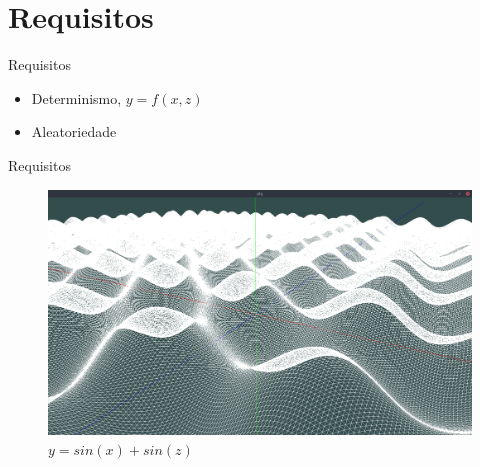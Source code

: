 \section{Requisitos}

\begin{frame}{Requisitos}
    \begin{itemize}
        \item Determinismo, $ y = f(x, z) $
        \item \alert{Aleatoriedade}
    \end{itemize}
\end{frame}

\begin{frame}{Requisitos}
    \begin{figure}
		\centering
        \includegraphics[width=.8\textwidth]{img/intro/sssins.png}
        \caption{$ y = sin(x) + sin(z) $}
    \end{figure}  
\end{frame}
